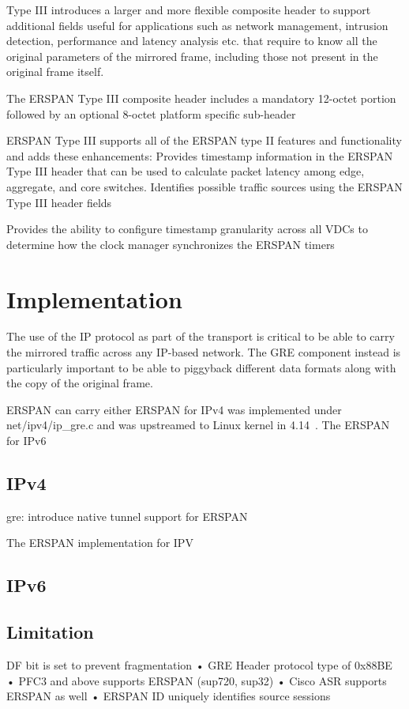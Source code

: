 \documentclass{sigplanconf}
\begin{document}
Type III introduces a larger and more flexible composite header to
support additional fields useful for applications such as network
management, intrusion detection, performance and latency analysis
etc. that require to know all the original parameters of the
mirrored frame, including those not present in the original frame
itself.

The ERSPAN Type III composite header includes a mandatory 12-octet
portion followed by an optional 8-octet platform specific sub-header

ERSPAN Type III supports all of the ERSPAN type II features and
functionality and adds these enhancements:
Provides timestamp information in the ERSPAN Type III header that can
be used to calculate packet latency among edge, aggregate, and core switches.
Identifies possible traffic sources using the ERSPAN Type III header fields

Provides the ability to configure timestamp granularity across all VDCs to
determine how the clock manager synchronizes the ERSPAN timers

\section{Implementation}
The use of the IP protocol as part of the transport is critical to
be able to carry the mirrored traffic across any IP-based network.
The GRE component instead is particularly important to be able to
piggyback different data formats along with the copy of the original
frame.

ERSPAN can carry either  
ERSPAN for IPv4 was implemented under net/ipv4/ip\_gre.c and was
upstreamed to Linux kernel in 4.14~\cite{erspanipv4}.
The ERSPAN for IPv6

\subsection{IPv4}

gre: introduce native tunnel support for ERSPAN

The ERSPAN implementation for IPV
\subsection{IPv6}
\subsection{Limitation}
DF bit is set to prevent fragmentation
• GRE Header protocol type of 0x88BE
• PFC3 and above supports ERSPAN (sup720, sup32)
• Cisco ASR supports ERSPAN as well
• ERSPAN ID uniquely identifies source sessions
\end{document}
